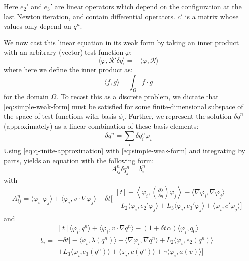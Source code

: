 \documentclass[reqno]{article}
\begin{document}
  Here $e_2'$ and $e_3'$ are linear operators which depend on the configuration
  at the last Newton iteration, and contain differential operators.
  $c'$ is a matrix whose values only depend on $q^n$.

  We now cast this linear equation in its weak form by taking an inner product
  with an arbitrary (vector) test function $\varphi$:
  \begin{equation}\label{eq:simple-weak-form}
    \langle \varphi, \mathcal{R}' \delta q \rangle
    = -\langle \varphi, \mathcal{R} \rangle
  \end{equation}
  where here we define the inner product as:
  \begin{equation} 
    \langle f, g \rangle
    =
    \int_\Omega f \cdot g
  \end{equation}
  for the domain $\Omega$.
  To recast this as a discrete problem, we dictate that
  \eqref{eq:simple-weak-form} must be satisfied for some finite-dimensional
  subspace of the space of test functions with basis $\phi_i$.
  Further, we represent the solution $\delta q^n$ (approximately) as a linear
  combination of these basis elements:
  \begin{equation} \label{eq:q-finite-approximation}
    \delta q^n = \sum_{i} \delta q^n_i \varphi_i
  \end{equation}
  Using \eqref{eq:q-finite-approximation} with \eqref{eq:simple-weak-form} and integrating
  by parts, yields an equation with the following form:
  \begin{equation}
    A^n_{ij} \delta q^n_j = b^n_i
  \end{equation}
  with
  \begin{equation}
    A^n_{ij}
    =
    \langle \varphi_i, \varphi_j \rangle
    + \langle \varphi_i, v \cdot \nabla \varphi_j \rangle
    - \delta t \biggl[
    \begin{multlined}[t]
      -\left< \varphi_i, \left( \frac{\partial \lambda}{\partial q} \right) \varphi_j \right>
      - \langle \nabla \varphi_i, \nabla \varphi_j \rangle \\
      + L_2 \langle \varphi_i, e_2' \varphi_j \rangle
      + L_3 \langle \varphi_i, e_3' \varphi_j \rangle
      + \langle \varphi_i, c' \varphi_j \rangle
      \biggr]
    \end{multlined}
  \end{equation}
  and
  \begin{equation}
    b_i
    =
    \begin{multlined}[t]
    \langle \varphi_i, q^n \rangle
    + \langle \varphi_i, v \cdot \nabla q^n \rangle
    - (1 + \delta t \, \alpha) \langle \varphi_i, q_0 \rangle \\
    - \delta t \biggl[
      - \langle \varphi_i, \lambda(q^n) \rangle
      - \langle \nabla \varphi_i, \nabla q^n \rangle
      + L_2 \langle \varphi_i, e_2(q^n) \rangle \\
      + L_3 \langle  \varphi_i, e_3(q^n) \rangle
      + \langle \varphi_i, c(q^n) \rangle
      + \gamma \langle \varphi_i, a(v) \rangle
    \biggr]
    \end{multlined}
  \end{equation}
\end{document}
